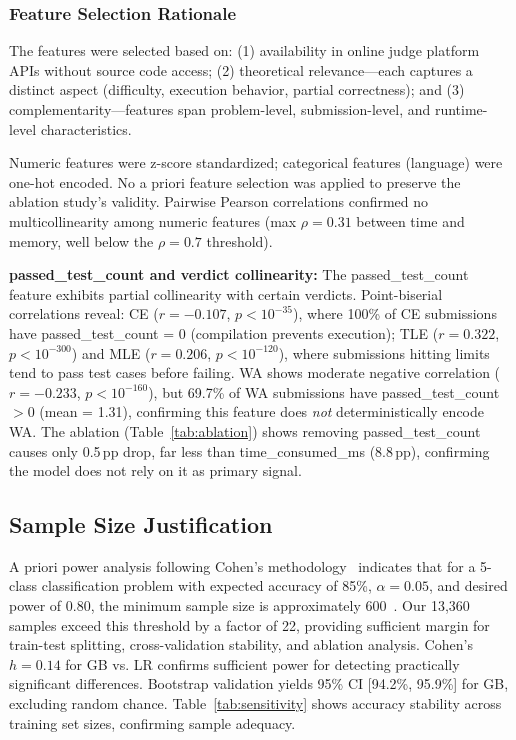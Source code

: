 \documentclass[acmsmall]{acmart}
\begin{document}
\subsubsection*{Feature Selection Rationale}
The features were selected based on: (1) availability in online judge platform
APIs without source code access; (2) theoretical relevance---each captures a
distinct aspect (difficulty, execution behavior, partial correctness); and
(3) complementarity---features span problem-level, submission-level, and
runtime-level characteristics.

Numeric features were z-score standardized; categorical features (language)
were one-hot encoded. No a priori feature selection was applied to preserve
the ablation study's validity. Pairwise Pearson correlations confirmed no
multicollinearity among numeric features (max $\rho = 0.31$ between time and memory,
well below the $\rho = 0.7$ threshold).

\textbf{passed\_test\_count and verdict collinearity:} The passed\_test\_count
feature exhibits partial collinearity with certain verdicts. Point-biserial
correlations reveal: CE ($r = -0.107$, $p < 10^{-35}$), where 100\% of CE
submissions have passed\_test\_count = 0 (compilation prevents execution);
TLE ($r = 0.322$, $p < 10^{-300}$) and MLE ($r = 0.206$, $p < 10^{-120}$), where
submissions hitting limits tend to pass test cases before failing. WA shows
moderate negative correlation ($r = -0.233$, $p < 10^{-160}$), but 69.7\% of WA
submissions have passed\_test\_count $> 0$ (mean = 1.31), confirming this feature
does \emph{not} deterministically encode WA. The ablation (Table~\ref{tab:ablation})
shows removing passed\_test\_count causes only 0.5\,pp drop, far less than
time\_consumed\_ms (8.8\,pp), confirming the model does not rely on it as primary signal.

\subsection{Sample Size Justification}

A priori power analysis following Cohen's methodology~\cite{cohen1988statistical}
indicates that for a 5-class classification problem with expected accuracy of
85\%, $\alpha = 0.05$, and desired power of 0.80, the minimum sample size is
approximately 600~\cite{lachenbruch1998power}. Our 13,360 samples exceed this
threshold by a factor of 22, providing sufficient margin for train-test
splitting, cross-validation stability, and ablation analysis. Cohen's
$h = 0.14$ for GB vs. LR confirms sufficient power for detecting practically
significant differences. Bootstrap validation yields 95\% CI [94.2\%, 95.9\%]
for GB, excluding random chance. Table~\ref{tab:sensitivity} shows accuracy
stability across training set sizes, confirming sample adequacy.
\end{document}
